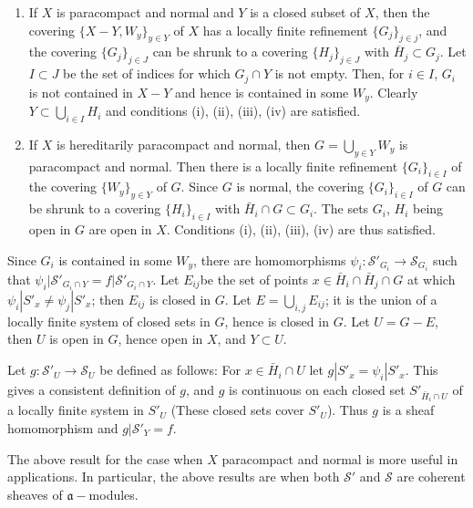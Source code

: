 \begin{enumerate}[(1)]
\item If $X$ is paracompact and normal and $Y$ is a closed subset of
  $X$, then the covering $\{ X - Y, W_y \}_{y \in Y}$ of $X$ has a
  locally finite refinement $\{ G_j \}_{j \in j}$, and the covering
  $\{ G_j \}_{j \in J}$ can be shrunk to a covering $\{ H_j \}_{j
    \in J}$ with $\bar{H}_j \subset G_j$. Let $I \subset J$ be the
  set of indices for which $G_j \cap Y$ is not empty. Then, for $i \in
  I$, $G_i$ is not contained in $X-Y$ and hence is contained in some
  $W_y$. Clearly $Y \subset \bigcup\limits_{i \in I} H_i$ and
  conditions (i), (ii), (iii), (iv) are satisfied. 

\item If $X$ is hereditarily paracompact and normal, then $G = \bigcup
  \limits_{y \in Y} W_y$ is paracompact and normal. Then there is a
  locally finite refinement $\{ G_i \}_{i \in I}$ of the covering $\{ W_y
  \}_{y \in Y}$ of $G$. Since $G$ is normal, the covering $\{ G_i
  \}_{i \in I}$ of $G$ can be shrunk to a covering $\{H_i \}_{i \in
    I}$ with $\bar{H}_i \cap G \subset G_i$. The sets $G_i$, $H_i$
  being open in $G$ are  open in $X$. Conditions (i), (ii), (iii),
  (iv) are thus satisfied. 
\end{enumerate}

Since $G_i$ is contained in some $W_y$, there are homomorphisms $\psi_i
: \mathscr{S'}_{G_i} \rightarrow \mathscr{S}_{G_i}$ such that $\psi_i
\Big| \mathscr{S'}_{G_i \cap Y} = f  \Big| \mathscr{S'}_{G_i \cap
  Y}$. Let $E_{ij}$\pageoriginale be the set of points $x \in
\bar{H}_i \cap \bar{H}_j \cap G$ at which 
$\psi_i |S'_x \neq \psi_j | S'_x$; then $E_{ij}$ is closed in $G$. Let
$E = \bigcup \limits_{i,j} E_{ij}$; it is the union of a locally
finite system of closed sets in $G$, hence is closed in $G$. Let $U =
G - E$, then $U$ is open in $G$, hence open in $X$, and $Y \subset
U$. 

Let $g : \mathscr{S'}_U \rightarrow \mathscr{S}_U$ be defined as
follows: For $x \in \bar{H}_i \cap U$ let $g | S'_x = \psi_i
|S'_x$. This gives a consistent definition of $g$, and $g$ is
continuous on each closed set $S'_{\bar{H}_i \cap U}$ of a locally
finite system in $S'_U$ (These closed sets cover $S'_U$). Thus $g$ is a
sheaf homomorphism and $g | \mathscr{S'}_Y =f $. 

The above result for the case when $X$ paracompact and normal is more
useful in applications. In particular, the above results are when both
$\mathscr{S'}$ and $\mathscr{S}$ are coherent sheaves of
$\mathfrak{a}-$modules.   

